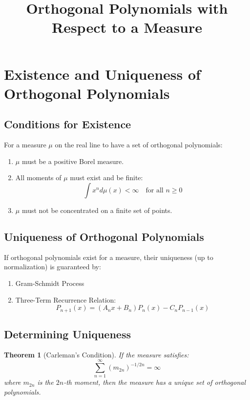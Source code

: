 \documentclass{article}
\title{Orthogonal Polynomials with Respect to a Measure}
\author{}
\date{}
\newtheorem{theorem}{Theorem}
\begin{document}
\maketitle

\section{Existence and Uniqueness of Orthogonal Polynomials}

\subsection{Conditions for Existence}

For a measure $\mu$ on the real line to have a set of orthogonal polynomials:

\begin{enumerate}
    \item $\mu$ must be a positive Borel measure.
    \item All moments of $\mu$ must exist and be finite:
    \[\int x^n d\mu(x) < \infty \quad \text{for all } n \geq 0\]
    \item $\mu$ must not be concentrated on a finite set of points.
\end{enumerate}

\subsection{Uniqueness of Orthogonal Polynomials}

If orthogonal polynomials exist for a measure, their uniqueness (up to normalization) is guaranteed by:

\begin{enumerate}
    \item Gram-Schmidt Process
    \item Three-Term Recurrence Relation:
    \[P_{n+1}(x) = (A_n x + B_n)P_n(x) - C_n P_{n-1}(x)\]
\end{enumerate}

\subsection{Determining Uniqueness}

\begin{theorem}[Carleman's Condition]
If the measure satisfies:
\[\sum_{n=1}^{\infty} (m_{2n})^{-1/2n} = \infty\]
where $m_{2n}$ is the $2n$-th moment, then the measure has a unique set of orthogonal polynomials.
\end{theorem}
\end{document}
